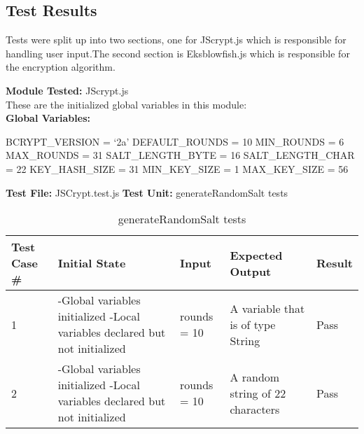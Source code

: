 \documentclass[12pt]{article}
\begin{document}
\subsection{Test Results}
Tests were split up into two sections, one for JScrypt.js which is responsible for handling user input.The second section is Eksblowfish.js which is responsible for the encryption algorithm. \newline

\noindent \textbf{Module Tested:} JScrypt.js \\
\noindent These are the initialized global variables in this module: \\
\textbf{Global Variables:}

\noindent BCRYPT\_VERSION = `2a' \newline
DEFAULT\_ROUNDS = 10 \newline
MIN\_ROUNDS = 6 \newline
MAX\_ROUNDS  = 31 \newline
SALT\_LENGTH\_BYTE = 16 \newline
SALT\_LENGTH\_CHAR = 22 \newline
KEY\_HASH\_SIZE = 31 \newline
MIN\_KEY\_SIZE = 1 \newline
MAX\_KEY\_SIZE = 56 \newline


\noindent \textbf{Test File:} JSCrypt.test.js \newline
\textbf{Test Unit:} generateRandomSalt tests \newline

\begin{table}[H]
\centering
      \caption{generateRandomSalt tests}
        \label{tab:table1}
      \begin{tabular}{ | p{1cm} | p{5cm} | p{4cm} | p{3cm} | p{1.2cm} | }
        \hline
            \textbf{Test Case \#} & \textbf{Initial State} & \textbf{Input} & \textbf{Expected \newline Output} & \textbf{Result} \\
        \hline
          1 & -Global variables initialized \newline -Local variables declared but not initialized & rounds = 10 & A variable that is of type String & Pass \\
       \hline
          2 & -Global variables initialized \newline -Local variables declared but not initialized & rounds = 10 & A random string of 22 characters & Pass \\
       \hline
      \end{tabular}
  \end{table}
\end{document}
